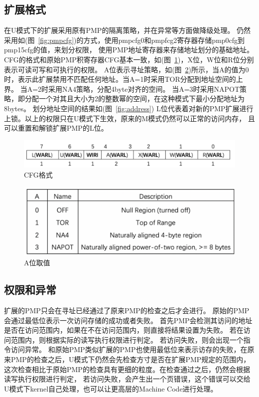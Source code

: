 \subsection{扩展格式}
在U模式下的扩展采用原有PMP的隔离策略\cite{keystone-p1}，并在异常等方面做降级处理。
仍然采用如(图~\ref{fig:pmpcfg})的方式，使用pmpcfg0和pmpfcg2寄存器存储pmp0cfg到pmp15cfg的值，来划分权限，
使用PMP地址寄存器来存储地址划分的基础地址。
CFG的格式和原始PMP积寄存器CFG基本一致，如(图~\ref{fig:cfgformat})，X位，W位和R位分别表示可读可写和可执行的权限\cite{keystone-p4}。
A位表示寻址策略，如(图~\ref{fig:afield})所示，当A的值为0时，表示此扩展禁用不匹配任何地址。当A=1时采用TOR分配到地址空间的上界。
当A=2时采用NA4策略，分配4byte对齐的空间。
当A=3时采用NAPOT策略，即分配一个对其且大小为2的整数幂的空间，在这种模式下最小分配地址为8bytes。
划分地址空间的结果如(图~\ref{fig:address})
L位代表着对新的PMP扩展进行上锁。以上的权限只在U模式下生效，原来的M模式仍然可以正常的访问内存，
且可以重置和解锁扩展PMP的L位。
\begin{figure}
    \centering
    \includegraphics[scale=0.30]{Figures/extend/cfgformat.png}
    \decoRule
    \caption{CFG格式}
    \label{fig:cfgformat}
\end{figure}
\begin{figure}
    \centering
    \includegraphics[scale=0.35]{Figures/extend/afield.png}
    \decoRule
    \caption{A位取值}
    \label{fig:afield}
\end{figure}

\subsection{权限和异常}
扩展的PMP只会在寻址已经通过了原来PMP的检查之后才会进行。
原始的PMP会通过最低位表示一次访问存储的成功或者失败。
首先PMP会检测其访问的地址是否在访问范围内，如果在不在访问范围内，则直接将结果设置为失败\cite{keystone-p4}。
若在访问范围内，则根据实际的读写执行权限进行判定。
若访问失败，则会出现一个指令访问异常。
和原始PMP类似扩展的PMP也使用最低位来表示访存的失败\cite{keystone-p4}，在原来PMP的检查之后，U模式下仍然会先检查方寸是否在扩展PMP规定的范围内，
这次检查相比于原始PMP的检查具有更细的粒度。在检查通过之后，仍然会根据读写执行权限进行判定，
若访问失败，会产生出一个页错误，这个错误可以交给U模式下kernel自己处理，也可以让更高层的Machine Code进行处理。


